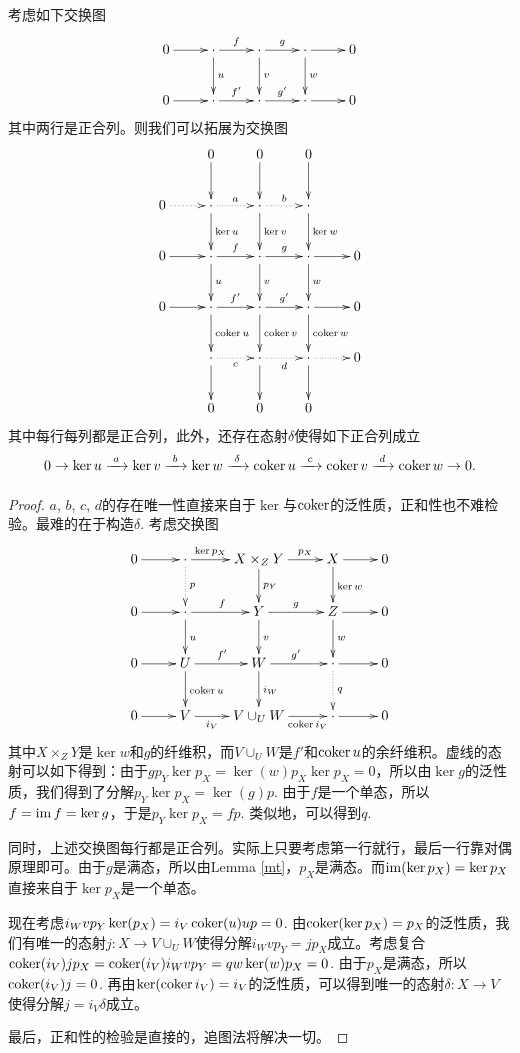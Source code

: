 \begin{lem}[蛇引理]\label{snake-lemma}
考虑如下交换图
\[
	\xymatrix{
	0\ar[r]&\cdot \ar[r]^{f}\ar[d]^{u}&\cdot \ar[r]^{g}\ar[d]^{v}&\cdot \ar[r]\ar[d]^{w}&0\\
	0\ar[r]&\cdot \ar[r]^{f'}&\cdot \ar[r]^{g'}&\cdot \ar[r]&0\\
	}
\]
其中两行是正合列。则我们可以拓展为交换图
\[
	\xymatrix{
	&0\ar[d]&0\ar[d]&0\ar[d]&\\
	0\ar@{.>}[r]&\cdot\ar@{.>}[r]^a\ar[d]^{\ker u}&\cdot\ar@{.>}[r]^b\ar[d]^{\ker v}&\cdot\ar[d]^{\ker w}&\\
	0\ar[r]&\cdot \ar[r]^{f}\ar[d]^{u}&\cdot \ar[r]^{g}\ar[d]^{v}&\cdot \ar[r]\ar[d]^{w}&0\\
	0\ar[r]&\cdot \ar[r]^{f'}\ar[d]^{\coker u}&\cdot \ar[r]^{g'}\ar[d]^{\coker v}&\cdot \ar[r]\ar[d]^{\coker w}&0\\
	&\cdot \ar@{.>}[r]_c\ar[d] &\cdot \ar@{.>}[r]_d\ar[d] &\cdot \ar@{.>}[r]\ar[d]& 0\\
	&0&0&0&\\
	}
\]
其中每行每列都是正合列，此外，还存在态射$\delta$使得如下正合列成立
\[
	0\to \ker u \xrightarrow[~~~]{a}\ker v \xrightarrow[~~~]{b}\ker w \xrightarrow[~~~]{\delta}\operatorname{coker} u \xrightarrow[~~~]{c}\operatorname{coker} v \xrightarrow[~~~]{d}\operatorname{coker} w \to 0.
\]
\end{lem}

\begin{proof}
$a$, $b$, $c$, $d$的存在唯一性直接来自于$\ker$与$\operatorname{coker}$的泛性质，正和性也不难检验。最难的在于构造$\delta$. 考虑交换图
\[
	\xymatrix{
	0\ar[r]&\cdot \ar[r]^-{\ker p_X}\ar@{.>}[d]^p&X\times_Z Y \ar[r]^-{p_X}\ar[d]^{p_Y}&X\ar[d]^{\ker w}\ar[r]&0\\
	0\ar[r]&\cdot \ar[r]^{f}\ar[d]^{u}&Y \ar[r]^{g}\ar[d]^{v}&Z \ar[d]^{w}\ar[r]&0\\
	0\ar[r]&U \ar[r]^{f'}\ar[d]^{\coker u}&W \ar[r]^{g'}\ar[d]^{i_W}&\cdot \ar@{.>}[d]^q\ar[r]&0\\
	0\ar[r]&V \ar[r]_-{i_V}&V\cup_U W \ar[r]_-{\coker i_V}&\cdot\ar[r]&0
	}
\]
其中$X\times_Z Y$是$\ker w$和$g$的纤维积，而$V\cup_U W$是$f'$和$\operatorname{coker} u$的余纤维积。虚线的态射可以如下得到：由于$gp_Y \ker p_X=\ker(w)p_X\ker p_X=0$，所以由$\ker g$的泛性质，我们得到了分解$p_Y\ker p_X=\ker(g)p$. 由于$f$是一个单态，所以$f=\operatorname{im} f=\ker g$，于是$p_Y\ker p_X=fp$. 类似地，可以得到$q$.

同时，上述交换图每行都是正合列。实际上只要考虑第一行就行，最后一行靠对偶原理即可。由于$g$是满态，所以由Lemma \ref{mt}，$p_X$是满态。而$\operatorname{im}(\ker p_X)=\ker p_X$直接来自于$\ker p_X$是一个单态。

现在考虑$i_Wvp_Y\ker(p_X)=i_V\operatorname{coker}(u)up=0$. 由$\operatorname{coker}(\ker p_X)=p_X$的泛性质，我们有唯一的态射$j:X\to V\cup_U W$使得分解$i_Wvp_Y=jp_X$成立。考虑复合$\operatorname{coker}(i_V)jp_X=\operatorname{coker}(i_V)i_Wvp_Y=qw\ker(w)p_X=0$. 由于$p_X$是满态，所以$\operatorname{coker}(i_V)j=0$. 再由$\ker(\operatorname{coker} i_V)=i_V$的泛性质，可以得到唯一的态射$\delta:X\to V$使得分解$j=i_V \delta$成立。

最后，正和性的检验是直接的，追图法将解决一切。
\end{proof}

